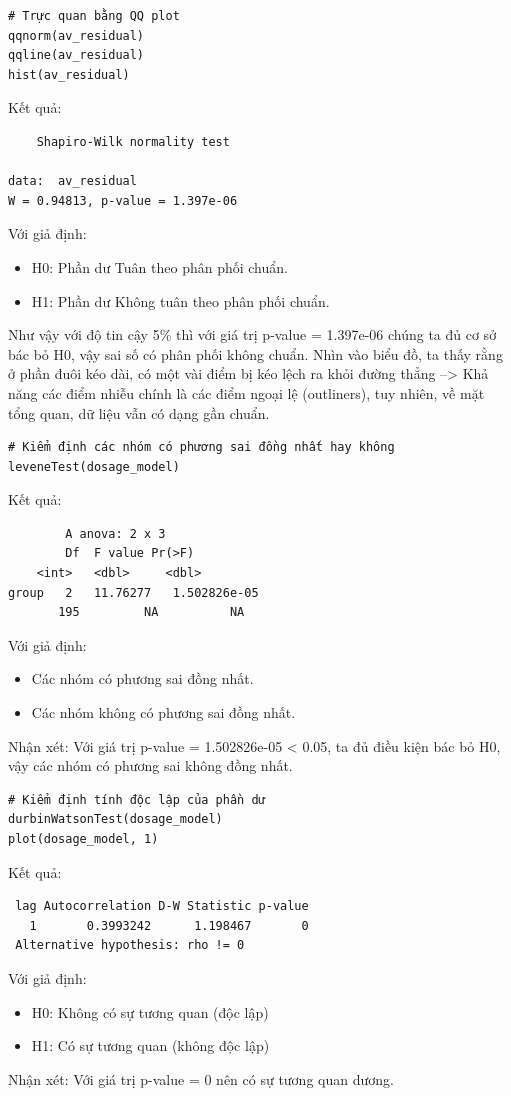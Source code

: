 \begin{itemize}
\begin{itemize}
\begin{lstlisting}
# Trực quan bằng QQ plot
qqnorm(av_residual)
qqline(av_residual)
hist(av_residual)
        \end{lstlisting}
        Kết quả:
        \begin{lstlisting}
    Shapiro-Wilk normality test

data:  av_residual
W = 0.94813, p-value = 1.397e-06
        \end{lstlisting}
        Với giả định:
        \begin{itemize}
            \item H0: Phần dư Tuân theo phân phối chuẩn.
            \item H1: Phần dư Không tuân theo phân phối chuẩn.
        \end{itemize}
        Như vậy với độ tin cậy 5\% thì với giá trị p-value = 1.397e-06 chúng ta đủ cơ sở bác bỏ H0, vậy sai số có phân phối không chuẩn. Nhìn vào biểu đồ, ta thấy rằng ở phần đuôi kéo dài, có một vài điểm bị kéo lệch ra khỏi đường thẳng --> Khả năng các điểm nhiễu chính là các điểm ngoại lệ (outliners), tuy nhiên, về mặt tổng quan, dữ liệu vẫn có dạng gần chuẩn.

    \begin{lstlisting}
# Kiểm định các nhóm có phương sai đồng nhất hay không
leveneTest(dosage_model)
    \end{lstlisting}
    Kết quả:
    \begin{lstlisting}
        A anova: 2 x 3 	
        Df	F value	Pr(>F)
	<int>	<dbl>	  <dbl>
group	2	11.76277   1.502826e-05
	   195	       NA	       NA
    \end{lstlisting}
    Với giả định:
    \begin{itemize}
        \item Các nhóm có phương sai đồng nhất.
        \item Các nhóm không có phương sai đồng nhất.
    \end{itemize}
    Nhận xét: Với giá trị p-value = 1.502826e-05 < 0.05, ta đủ điều kiện bác bỏ H0, vậy các nhóm có phương sai không đồng nhất.
    \end{itemize}
    \begin{lstlisting}
# Kiểm định tính độc lập của phần dư
durbinWatsonTest(dosage_model)
plot(dosage_model, 1)
    \end{lstlisting}
    Kết quả:
    \begin{lstlisting}
 lag Autocorrelation D-W Statistic p-value
   1       0.3993242      1.198467       0
 Alternative hypothesis: rho != 0        
    \end{lstlisting}
    Với giả định:
    \begin{itemize}
        \item H0: Không có sự tương quan (độc lập)
        \item H1: Có sự tương quan (không độc lập)
    \end{itemize}
    Nhận xét: Với giá trị p-value = 0 nên có sự tương quan dương.


\end{itemize}
